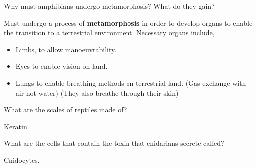 \documentclass[12pt]{article} %
\begin{document}
  \begin{qstn}
    Why must amphibians undergo metamorphosis? What do they gain?
  \end{qstn}
  \begin{soln}
    Must undergo a process of \textbf{metamorphosis} in order to develop organs to enable the transition to a
    terrestrial environment. Necessary organs include,
    \begin{itemize}
      \item Limbs, to allow manoeuvrability.
      \item Eyes to enable vision on land.
      \item Lungs to enable breathing methods on terrestrial land. (Gas exchange with air not water) (They also breathe
      through their skin)
    \end{itemize}
  \end{soln}

  \begin{qstn}
    What are the scales of reptiles made of?
  \end{qstn}
  \begin{soln}
    Keratin.
  \end{soln}

  \begin{qstn}
    What are the cells that contain the toxin that cnidarians secrete called?
  \end{qstn}
  \begin{soln}
    Cnidocytes.
  \end{soln}
\end{document}
